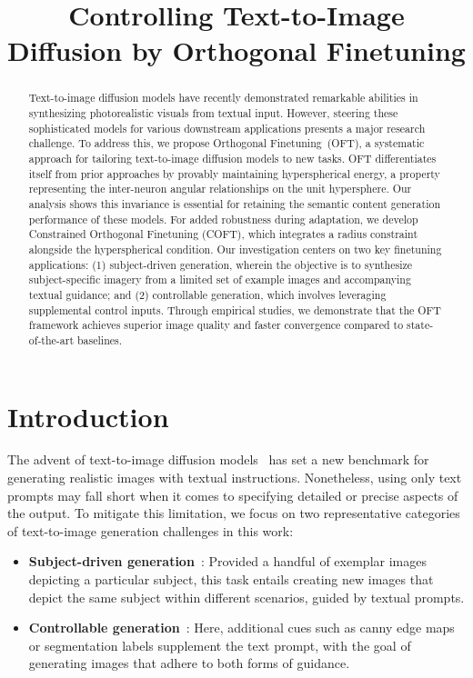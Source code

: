 \title{Controlling Text-to-Image Diffusion by Orthogonal Finetuning}

\begin{abstract}
Text-to-image diffusion models have recently demonstrated remarkable abilities in synthesizing photorealistic visuals from textual input. However, steering these sophisticated models for various downstream applications presents a major research challenge. To address this, we propose Orthogonal Finetuning~(OFT), a systematic approach for tailoring text-to-image diffusion models to new tasks. OFT differentiates itself from prior approaches by provably maintaining hyperspherical energy, a property representing the inter-neuron angular relationships on the unit hypersphere. Our analysis shows this invariance is essential for retaining the semantic content generation performance of these models. For added robustness during adaptation, we develop Constrained Orthogonal Finetuning (COFT), which integrates a radius constraint alongside the hyperspherical condition. Our investigation centers on two key finetuning applications: (1) subject-driven generation, wherein the objective is to synthesize subject-specific imagery from a limited set of example images and accompanying textual guidance; and (2) controllable generation, which involves leveraging supplemental control inputs. Through empirical studies, we demonstrate that the OFT framework achieves superior image quality and faster convergence compared to state-of-the-art baselines.
\end{abstract}

\section{Introduction}

The advent of text-to-image diffusion models~\cite{saharia2022photorealistic,ramesh2022hierarchical,rombach2022high} has set a new benchmark for generating realistic images with textual instructions. Nonetheless, using only text prompts may fall short when it comes to specifying detailed or precise aspects of the output. To mitigate this limitation, we focus on two representative categories of text-to-image generation challenges in this work:

\begin{itemize}[leftmargin=*,nosep]

    \item \textbf{Subject-driven generation}~\cite{ruiz2023dreambooth}: Provided a handful of exemplar images depicting a particular subject, this task entails creating new images that depict the same subject within different scenarios, guided by textual prompts.
    \item \textbf{Controllable generation}~\cite{zhang2023adding,mou2023t2i}: Here, additional cues such as canny edge maps or segmentation labels supplement the text prompt, with the goal of generating images that adhere to both forms of guidance.
\end{itemize}

